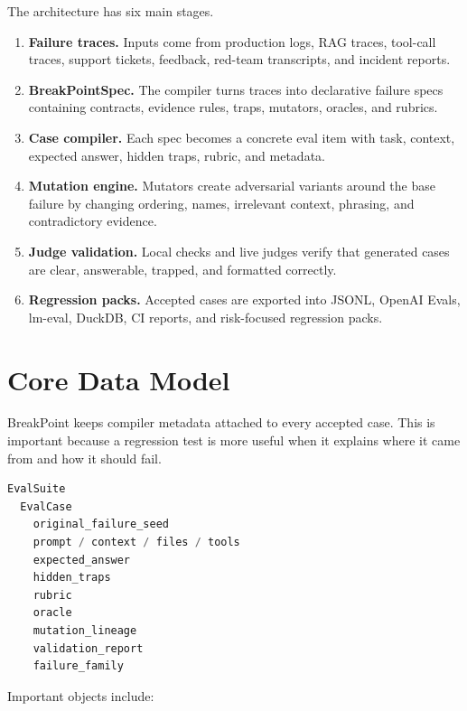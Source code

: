 \documentclass[11pt]{article}
\begin{document}
The architecture has six main stages.

\begin{enumerate}
  \item \textbf{Failure traces.} Inputs come from production logs, RAG traces, tool-call traces, support tickets, feedback, red-team transcripts, and incident reports.
  \item \textbf{BreakPointSpec.} The compiler turns traces into declarative failure specs containing contracts, evidence rules, traps, mutators, oracles, and rubrics.
  \item \textbf{Case compiler.} Each spec becomes a concrete eval item with task, context, expected answer, hidden traps, rubric, and metadata.
  \item \textbf{Mutation engine.} Mutators create adversarial variants around the base failure by changing ordering, names, irrelevant context, phrasing, and contradictory evidence.
  \item \textbf{Judge validation.} Local checks and live judges verify that generated cases are clear, answerable, trapped, and formatted correctly.
  \item \textbf{Regression packs.} Accepted cases are exported into JSONL, OpenAI Evals, lm-eval, DuckDB, CI reports, and risk-focused regression packs.
\end{enumerate}

\section{Core Data Model}

BreakPoint keeps compiler metadata attached to every accepted case. This is important because a regression test is more useful when it explains where it came from and how it should fail.

\begin{lstlisting}[language=Python,caption={Simplified eval case shape}]
EvalSuite
  EvalCase
    original_failure_seed
    prompt / context / files / tools
    expected_answer
    hidden_traps
    rubric
    oracle
    mutation_lineage
    validation_report
    failure_family
\end{lstlisting}

Important objects include:
\end{document}
